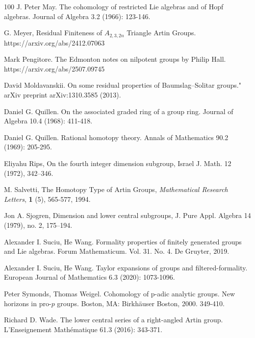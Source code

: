 \documentclass[10pt, oneside]{amsart}
\theoremstyle{definition}
\theoremstyle{remark}
\theoremstyle{plain}
\begin{document}
\begin{thebibliography}{100}
 J. Peter May. The cohomology of restricted Lie algebras and of Hopf algebras. Journal of Algebra 3.2 (1966): 123-146.

 G. Meyer, Residual Finiteness of $A_{2,3,2n}$ Triangle Artin Groups. https://arxiv.org/abs/2412.07063


 Mark Pengitore. The Edmonton notes on nilpotent groups by Philip Hall. https://arxiv.org/abs/2507.09745 %

 David Moldavanskii. On some residual properties of Baumslag--Solitar groups." arXiv preprint arXiv:1310.3585 (2013).

 Daniel G. Quillen. On the associated graded ring of a group ring. Journal of Algebra 10.4 (1968): 411-418.

 Daniel G. Quillen. Rational homotopy theory. Annals of Mathematics 90.2 (1969): 205-295.


 Eliyahu Rips, On the fourth integer dimension subgroup, Israel J. Math. 12 (1972), 342–346.

	 M. Salvetti, The Homotopy Type of Artin Groups, \textit{Mathematical Research Letters}, \textbf{1} (5), 565-577, 1994.
     

 Jon A. Sjogren, Dimension and lower central subgroups, J. Pure Appl. Algebra 14 (1979), no. 2, 175–194.



 Alexander I. Suciu,  He Wang. Formality properties of finitely generated groups and Lie algebras. Forum Mathematicum. Vol. 31. No. 4. De Gruyter, 2019.

 Alexander I. Suciu,  He Wang. Taylor expansions of groups and filtered-formality. European Journal of Mathematics 6.3 (2020): 1073-1096.

 Peter Symonds, Thomas Weigel. Cohomology of p-adic analytic groups. New horizons in pro-$p$ groups. Boston, MA: Birkh\"auser Boston, 2000. 349-410.


 Richard D. Wade. The lower central series of a right-angled Artin group. L’Enseignement Mathématique 61.3 (2016): 343-371.

\end{thebibliography}
\end{document}
